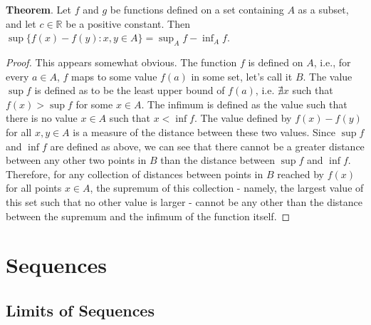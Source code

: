 \documentclass[12pt]{book}
\newenvironment{exercise}[2][Exercise]{\begin{trivlist}
\item[\hskip \labelsep {\bfseries #1}\hskip \labelsep {\bfseries #2.}]}{\end{trivlist}}
\begin{document}
\begin{exercise}{1.4.6}
\begin{exercise}{1.5.13}
\textbf{Theorem}. Let $f$ and $g$ be functions defined on a set containing $A$ as a subset, and let $c \in \mathbb{R}$ be a positive constant. Then $\sup \{ f(x) - f(y): x, y \in A \} = \sup_A f - \inf_A f$.
	\begin{proof}
	This appears somewhat obvious. The function $f$ is defined on $A$, i.e., for every $a \in A$, $f$ maps to some value $f(a)$ in some set, let's call it $B$. The value $\sup f$ is defined as to be the least upper bound of $f(a)$, i.e. $\nexists x$ such that $f(x) > \sup f$ for some $x \in A$. The infimum is defined as the value such that there is no value $x \in A$ such that $x < \inf f$. The value defined by $f(x) - f(y)$ for all $x,y \in A$ is a measure of the distance between these two values. Since $\sup f$ and $\inf f$ are defined as above, we can see that there cannot be a greater distance between any other two points in $B$ than the distance between $\sup f$ and $\inf f$. Therefore, for any collection of distances between points in $B$ reached by $f(x)$ for all points $x \in A$, the supremum of this collection - namely, the largest value of this set such that no other value is larger - cannot be any other than the distance between the supremum and the infimum of the function itself.
	\end{proof}
\end{exercise}



\chapter{Sequences}
\section{Limits of Sequences}


\end{exercise}
\end{document}
